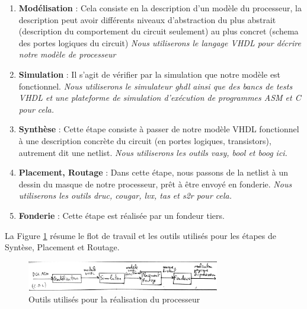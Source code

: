 \documentclass{article}
\begin{document}
\begin{enumerate}
\item \textbf{Modélisation}  : Cela consiste en la description d'un modèle du processeur,
                      la description peut avoir différents niveaux d'abstraction
                      du plus abstrait (description du comportement du circuit seulement)
                      au plus concret (schema des portes logiques du circuit)
                      \textit{Nous utiliserons le langage VHDL pour décrire notre modèle de processeur}
\item \textbf{Simulation}    : Il s'agit de vérifier par la simulation que notre modèle est fonctionnel. 
                      \textit{Nous utiliserons le simulateur ghdl ainsi que des bancs de tests VHDL
                      et une plateforme de simulation d'exécution de programmes ASM et C pour cela.}
\item \textbf{Synthèse} : Cette étape consiste à passer de notre modèle VHDL fonctionnel à une description
                          concrète du circuit (en portes logiques, transistors), autrement dit une netlist.
                          \textit{Nous utiliserons les outils vasy, bool et boog ici.}
\item \textbf{Placement, Routage} : Dans cette étape, nous passons de la netlist à un
                          dessin du masque de notre processeur, prêt à être envoyé en fonderie.
                          \textit{Nous utiliserons les outils druc, cougar, lvx, tas et s2r pour cela.}
\item \textbf{Fonderie} :          Cette étape est réalisée par un fondeur tiers.
\end{enumerate}

La Figure \ref{outils} résume le flot de travail et les outils utilisés pour les étapes de Syntèse,
Placement et Routage.

\begin{figure}[H]
\includegraphics[width=0.75\textwidth]{pics/conception.png}
\centering
\caption{Outils utilisés pour la réalisation du processeur}
\label{outils}
\end{figure}

\end{document}

